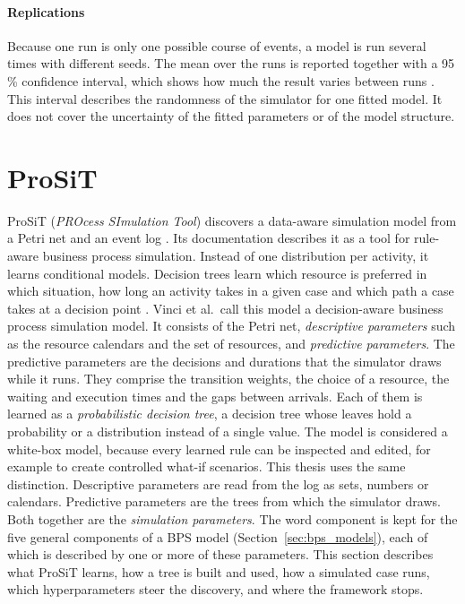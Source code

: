 \paragraph{Replications}
\label{sec:stochastic_replication_ci}
Because one run is only one possible course of events, a model is run several
times with different seeds. The mean over the runs is reported together with a
95\,\% confidence interval, which shows how much the result varies between runs
\cite{Law2015Simulation}. This interval describes the randomness of the
simulator for one fitted model. It does not cover the uncertainty of the fitted
parameters or of the model structure.

\section{ProSiT}
\label{sec:prosit_background}

ProSiT (\textit{PROcess SImulation Tool}) discovers a data-aware simulation
model from a Petri net and an event log \cite{Vinci2026prosit,ProSiTRepository}.
Its documentation describes it as a tool for rule-aware business process
simulation. Instead of one distribution per activity, it learns conditional
models. Decision trees learn which resource is preferred in which
situation, how long an activity takes in a given case and which path a case takes
at a decision point \cite{ProSiTDocs}.
Vinci et al.\ call this model a decision-aware business process simulation
model. It consists of the Petri net, \emph{descriptive parameters} such as the
resource calendars and the set of resources, and \emph{predictive parameters}.
The predictive parameters are the decisions and durations that the simulator
draws while it runs. They comprise the transition weights, the choice of a resource,
the waiting and execution times and the gaps between arrivals. Each of them is learned as a
\emph{probabilistic decision tree}, a decision tree whose leaves hold a
probability or a distribution instead of a single value. The model is considered
a white-box model, because every learned rule can be inspected and edited, for
example to create controlled what-if scenarios. This thesis uses the same
distinction. Descriptive parameters are read from the log as sets, numbers or
calendars. Predictive parameters are the trees from which the simulator draws.
Both together are the \emph{simulation parameters}. The word component is kept
for the five general components of a BPS model (Section~\ref{sec:bps_models}),
each of which is described by one or more of these parameters. This section
describes what ProSiT learns, how a tree is built and used, how a simulated case runs, which
hyperparameters steer the discovery, and where the framework stops.

